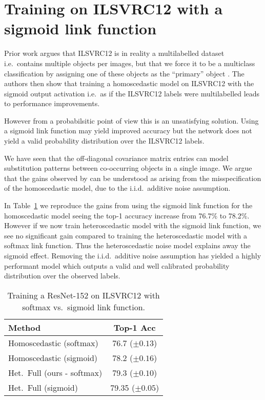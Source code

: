 \documentclass[final]{cvpr}
\begin{document}
\section{Training on ILSVRC12 with a sigmoid link function}
\label{app:sigmoid_ilsvrc12}

Prior work argues that ILSVRC12 is in reality a multilabelled dataset i.e.\ contains multiple objects per images, but that we force it to be a multiclass classification by assigning one of these objects as the ``primary'' object \cite{beyer2020we}. The authors then show that training a homoscedastic model on ILSVRC12 with the sigmoid output activation i.e.\ as if the ILSVRC12 labels were multilabelled leads to performance improvements.

However from a probabilsitic point of view this is an unsatisfying  solution. Using a sigmoid link function may yield improved accuracy but the network does not yield a valid probability distribution over the ILSVRC12 labels.

We have seen that the off-diagonal covariance matrix entries can model substitution patterns between co-occurring objects in a single image. We argue that the gains observed by \citet{beyer2020we} can be understood as arising from the misspecification of the homoscedastic model, due to the i.i.d.\ additive noise assumption.

In Table~\ref{table:sigmoid_ilsvrc12} we reproduce the gains from using the sigmoid link function for the homoscedastic model seeing the top-1 accuracy increase from 76.7\% to 78.2\%. However if we now train heteroscedastic model with the sigmoid link function, we see no significant gain compared to training the heteroscedastic model with a softmax link function. Thus the heteroscedastic noise model explains away the sigmoid effect. Removing the i.i.d.\ additive noise assumption has yielded a highly performant model which outputs a valid and well calibrated probability distribution over the observed labels.

\begin{table}[tbh]
\centering
\begin{tabular}{lc}
\toprule
Method & Top-1 Acc \\
\midrule
Homoscedastic (softmax) & 76.7 ($\pm 0.13$) \\
Homoscedastic (sigmoid) & 78.2 ($\pm 0.16$) \\
Het.\ Full (ours - softmax) & 79.3  ($\pm 0.10$) \\ 
Het.\ Full (sigmoid) & 79.35 ($\pm 0.05$) \\ 
\bottomrule
\end{tabular}
\caption{Training a ResNet-152 on ILSVRC12 with softmax vs.\ sigmoid link function.} 
\label{table:sigmoid_ilsvrc12}
\end{table}
\end{document}
